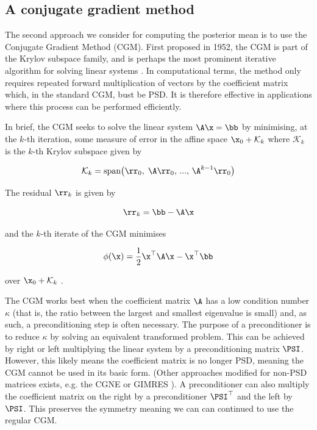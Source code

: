 \subsection{A conjugate gradient method}

\label{sec:CGM}

The second approach we consider for computing the posterior mean is to use the Conjugate Gradient Method (CGM). First proposed in 1952, the CGM is part of the Krylov subspace family, and is perhaps the most prominent iterative algorithm for solving linear systems \citep{Hestenes1952}. In computational terms, the method only requires repeated forward multiplication of vectors by the coefficient matrix which, in the standard CGM, bust be PSD. It is therefore effective in applications where this process can be performed efficiently. 

In brief, the CGM seeks to solve the linear system $\A \x = \bb$ by minimising, at the $k$-th iteration, some measure of error in the affine space $\x_0 + \mathcal{K}_k$ where $\mathcal{K}_k$ is the $k$-th Krylov subspace given by  

$$
\mathcal{K}_k = \text{span}\big(\rr_0, \; \A \rr_0, \, ..., \, \A^{k-1} \rr_0 \big)
$$

The residual $\rr_k$ is given by 

$$
\rr_k = \bb - \A \x
$$

and the $k$-th iterate of the CGM minimises 

$$
\phi(\x) = \frac{1}{2} \x^\top \A \x  - \x^\top \bb
$$

over $\x_0 + \mathcal{K}_k$ \citep{Kelley1995}. 

The CGM works best when the coefficient matrix $\A$ has a low condition number $\kappa$ (that is, the ratio between the largest and smallest eigenvalue is small) and, as such, a preconditioning step is often necessary. The purpose of a preconditioner is to reduce $\kappa$ by solving an equivalent transformed problem. This can be achieved by right or left multiplying the linear system by a preconditioning matrix $\PSI$. However, this likely means the coefficient matrix is no longer PSD, meaning the CGM cannot be used in its basic form. (Other approaches modified for non-PSD matrices exists, e.g. the CGNE or GIMRES \citep{Elman1982, Saad1986}). A preconditioner can also multiply the coefficient matrix on the right by a preconditioner $\PSI^\top$ and the left by $\PSI$. This preserves the symmetry meaning we can can continued to use the regular CGM. 

